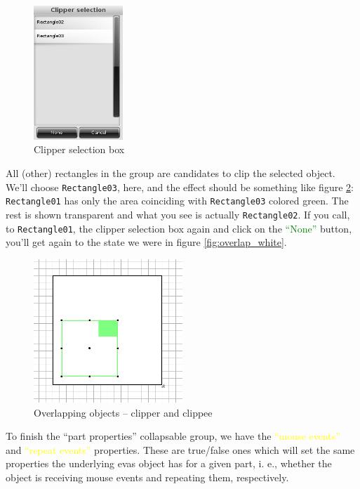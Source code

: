 \documentclass[a4paper]{profusion}
\newcommand{\GUIButton}[1]{\textcolor{green}{#1}} %
\newcommand{\GUIEditable}[1]{\textcolor{yellow}{#1}} %
\begin{document}
\begin{figure}[h!]
  \centering
  \includegraphics[width=0.3\textwidth]{images/clipping_box.png}
  \caption{Clipper selection box}
  \label{fig:clipping_box}
\end{figure}

All (other) rectangles in the group are candidates to clip the
selected object. We'll choose \texttt{Rectangle03}, here, and the
effect should be something like figure \ref{fig:overlap_clipped}:
\texttt{Rectangle01} has only the area coinciding with
\texttt{Rectangle03} colored green. The rest is shown transparent and
what you see is actually \texttt{Rectangle02}. If you call, to
\texttt{Rectangle01}, the clipper selection box again and click on the
\GUIButton{``None''} button, you'll get again to the state we were in
figure \ref{fig:overlap_white}.

\begin{figure}[h!]
  \centering
  \includegraphics[width=0.5\textwidth]{images/rectangle_overlap_clipping.png}
  \caption{Overlapping objects -- clipper and clippee}
  \label{fig:overlap_clipped}
\end{figure}

To finish the ``part properties'' collapsable group, we have the
\GUIEditable{``mouse events''} and \GUIEditable{``repeat events''}
properties. These are true/false ones which will set the same
properties the underlying evas object has for a given part, i. e.,
whether the object is receiving mouse events and repeating them,
respectively.
\end{document}
